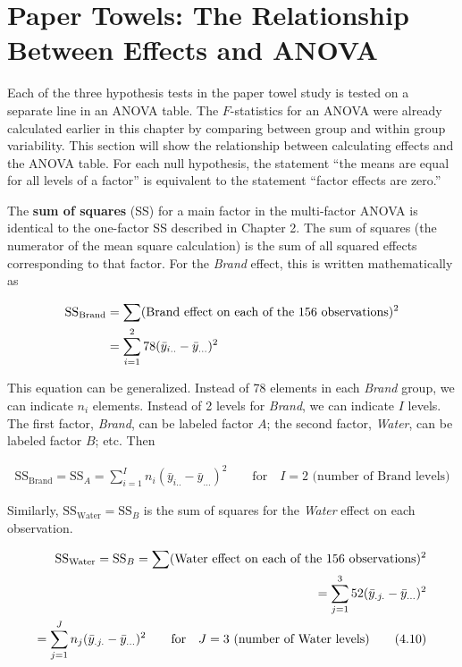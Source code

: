 \documentclass[
]{report}
\begin{document}
\section{\texorpdfstring{\textbf{Paper Towels: The Relationship Between Effects and ANOVA}}{Paper Towels: The Relationship Between Effects and ANOVA}}\label{paper-towels-the-relationship-between-effects-and-anova}

Each of the three hypothesis tests in the paper towel study is tested on a separate line in an ANOVA table. The \(F\)-statistics for an ANOVA were already calculated earlier in this chapter by comparing between group and within group variability. This section will show the relationship between calculating effects and the ANOVA table. For each null hypothesis, the statement ``the means are equal for all levels of a factor'' is equivalent to the statement ``factor effects are zero.''

The \textbf{sum of squares} (SS) for a main factor in the multi-factor ANOVA is identical to the one-factor SS described in Chapter 2. The sum of squares (the numerator of the mean square calculation) is the sum of all squared effects corresponding to that factor. For the \emph{Brand} effect, this is written mathematically as

\begin{align}
\text{SS}_{\text{Brand}} &= \sum (\text{Brand effect on each of the 156 observations})^2 \notag \\
&= \sum_{i=1}^{2} 78(\bar{y}_{i..} - \bar{y}_{...})^2
\notag
\end{align}

This equation can be generalized. Instead of 78 elements in each \emph{Brand} group, we can indicate \(n_i\) elements. Instead of 2 levels for \emph{Brand}, we can indicate \(I\) levels. The first factor, \emph{Brand}, can be labeled factor \(A\); the second factor, \emph{Water}, can be labeled factor \(B\); etc. Then

\begin{align}\label{4.9}
\text{SS}_{\text{Brand}} = \text{SS}_A = \sum_{i=1}^{I} n_i(\bar{y}_{i..} - \bar{y}_{...})^2 \qquad \text{for} \quad I=2 \text{ (number of Brand levels)}
\tag{4.9}
\end{align}

Similarly, \(\text{SS}_{\text{Water}} = \text{SS}_B\) is the sum of squares for the \emph{Water} effect on each observation.

\begin{align}\label{4.10}
\text{SS}_{\text{Water}} = \text{SS}_B = \sum (\text{Water effect on each of the 156 observations})^2 \notag \\
= \sum_{j=1}^{3} 52(\bar{y}_{.j.} - \bar{y}_{...})^2 \notag \\
= \sum_{j=1}^{J} n_j(\bar{y}_{.j.} - \bar{y}_{...})^2 \qquad \text{for} \quad J=3 \text{ (number of Water levels)}
\tag{4.10}
\end{align}
\end{document}
